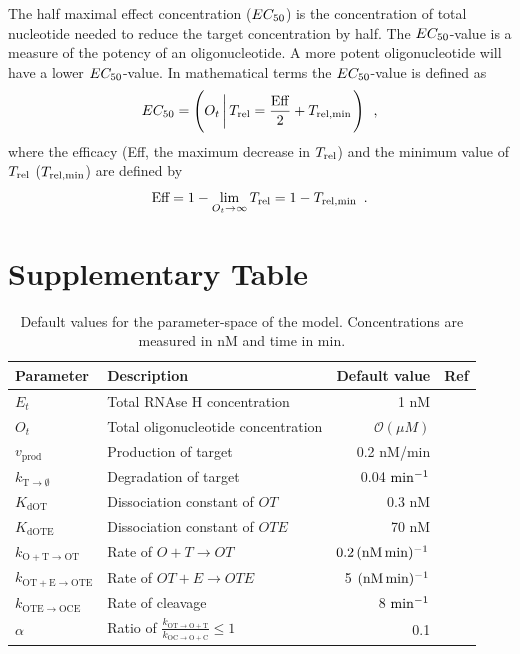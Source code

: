 \documentclass[a4paper,11pt]{article}
\newcommand{\kmo}{k_{\mathrm{OT \to O+T}}}
\newcommand{\kOpT}{k_{\mathrm{O+T \to OT}}}
\newcommand{\kt}{k_{\mathrm{OT+E \to OTE}}}
\newcommand{\kE}{k_{\mathrm{OTE \to OCE}}}
\newcommand{\kD}{k_{\mathrm{OC \to O+C}}}
\newcommand{\vp}{v_{\mathrm{prod}}}
\newcommand{\vd}{k_{\mathrm{T \to \emptyset}}}
\newcommand{\Trel}{T_{\rm{rel}}}
\newcommand{\EC}{EC_{\rm{50}}}
\newcommand{\KdOT}{K_{\mathrm{dOT}}}
\newcommand{\KdOTE}{K_{\mathrm{dOTE}}}
\newcommand{\Trelmin}{T_{\rm{rel,min}}}
\begin{document}
The half maximal effect concentration ($\EC$) is the concentration of total nucleotide needed to reduce the target concentration by half. The $\EC$-value is a measure of the potency of an oligonucleotide. A more potent oligonucleotide will have a lower $\EC$-value. In mathematical terms the $\EC$-value is defined as
\begin{equation}
\EC = \left(O_t \left|\, \Trel = \frac{\mathrm{Eff}}{2}+\Trelmin \right.\right)  \enspace, \label{eq::EC50}
\end{equation}
where the efficacy (Eff, the maximum decrease in $\Trel$) and the minimum value of $\Trel$ ($\Trelmin$) are defined by
\begin{equation}
\textrm{Eff}=1-\lim_{O_t \to \infty} \Trel =1 - \Trelmin \label{eq:Eff} \enspace.
\end{equation}

\section{Supplementary Table}
\begin{table}[!h]
\caption{Default values for the parameter-space of the model. Concentrations are measured in nM and time in min.}\label{tb::par}
\setlength\extrarowheight{5pt}  %
\begin{tabular}{| l | l | r | l |}
\hline
Parameter & Description &Default value & Ref  \\
\hline
$E_t$ & Total RNAse H concentration & 1 nM & \cite{Amirkhanov:2002vo}\\
$O_t$ & Total oligonucleotide concentration & $\mathcal{O}(\mu M )$ & {}\\
$\vp$ & Production of target & 0.2 nM/min & \cite{lodish2008molecular}\\
$\vd$ & Degradation of target & 0.04 $\rm{min}^{-1}$ &  \cite{Yang:2003ja}\\
$\KdOT$ & Dissociation constant of $OT$ & 0.3 nM &  \cite{Christensen:2001te} \\
$\KdOTE$ & Dissociation constant of $OTE$  & 70 nM &  \cite{Amirkhanov:2002vo} \\
$\kOpT$ & Rate of $O+T \to OT$ & $0.2 \, (\rm{nM \,min})^{-1}$ &  \cite{Christensen:2001te}\\
$\kt$ & Rate of $OT+E \to OTE$  & 5 $(\rm{nM \,min})^{-1}$ &  \cite{Amirkhanov:2002vo}\\
$\kE$ & Rate of cleavage  & 8 $\rm{min}^{-1}$ & \cite{Amirkhanov:2002vo}\\
$\alpha$ & Ratio of $\frac{\kmo}{\kD} \le 1$ & 0.1  & {}\\
\hline
\end{tabular}
\end{table}
\end{document}
